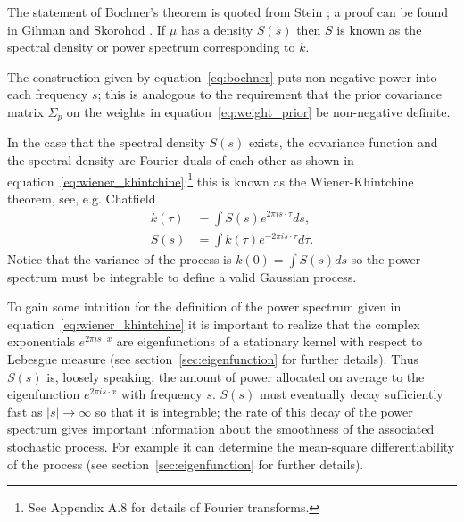 \documentclass[11pt]{book}
\begin{document}
The statement of Bochner's theorem is quoted from Stein \cite{stein1999}; a proof can be found in Gihman and Skorohod \cite{gihman1974}. If $\mu$ has a density $S(s)$ then $S$ is known as the spectral density or power spectrum corresponding to $k$.

The construction given by equation~\eqref{eq:bochner} puts non-negative power into each frequency $s$; this is analogous to the requirement that the prior covariance matrix $\Sigma_p$ on the weights in equation~\eqref{eq:weight_prior} be non-negative definite.

In the case that the spectral density $S(s)$ exists, the covariance function and the spectral density are Fourier duals of each other as shown in equation~\eqref{eq:wiener_khintchine};\footnote{See Appendix A.8 for details of Fourier transforms.} this is known as the Wiener-Khintchine theorem, see, e.g. Chatfield \cite{chatfield1989}
\begin{align}
\label{eq:wiener_khintchine}
k(\tau) &= \int S(s) e^{2\pi i s \cdot \tau} ds, \\
S(s) &= \int k(\tau) e^{-2\pi i s \cdot \tau} d\tau. \nonumber
\end{align}
Notice that the variance of the process is $k(0) = \int S(s) ds$ so the power spectrum must be integrable to define a valid Gaussian process.

To gain some intuition for the definition of the power spectrum given in equation~\eqref{eq:wiener_khintchine} it is important to realize that the complex exponentials $e^{2\pi i s \cdot x}$ are eigenfunctions of a stationary kernel with respect to Lebesgue measure (see section~\ref{sec:eigenfunction} for further details). Thus $S(s)$ is, loosely speaking, the amount of power allocated on average to the eigenfunction $e^{2\pi i s \cdot x}$ with frequency $s$. $S(s)$ must eventually decay sufficiently fast as $|s| \to \infty$ so that it is integrable; the rate of this decay of the power spectrum gives important information about the smoothness of the associated stochastic process. For example it can determine the mean-square differentiability of the process (see section~\ref{sec:eigenfunction} for further details).
\end{document}
